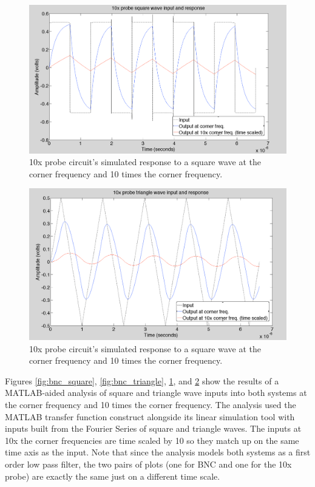 \documentclass[12pt,letterpaper]{report}
\begin{document}
\begin{figure}
	\centering
	\includegraphics[width=\linewidth, keepaspectratio=true]{lab1_images/MATLAB_10x_square.png} 
	\caption{10x probe circuit's simulated response to a square wave at the corner frequency and 10 times the corner frequency.}
	\label{fig:probe_square}
\end{figure}

\begin{figure}
	\centering
	\includegraphics[width=\linewidth, keepaspectratio=true]{lab1_images/MATLAB_10x_triangle.png} 
	\caption{10x probe circuit's simulated response to a square wave at the corner frequency and 10 times the corner frequency.}
	\label{fig:probe_triangle}
\end{figure}

Figures \ref{fig:bnc_square}, \ref{fig:bnc_triangle}, \ref{fig:probe_square}, and \ref{fig:probe_triangle} show the results of a MATLAB-aided analysis of square and triangle wave inputs into both systems at the corner frequency and 10 times the corner frequency. The analysis used the MATLAB transfer function construct alongside its linear simulation tool with inputs built from the Fourier Series of square and triangle waves. The inputs at 10x the corner frequencies are time scaled by 10 so they match up on the same time axis as the input. Note that since the analysis models both systems as a first order low pass filter, the two pairs of plots (one for BNC and one for the 10x probe) are exactly the same just on a different time scale.
\end{document}
